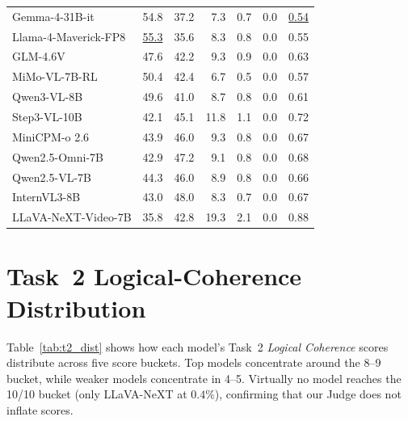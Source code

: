 \documentclass{article}
\newcommand{\second}[1]{\underline{#1}}
\begin{document}
\begin{table}[t]
{\begin{tabular}{lrrrrrr}
Gemma-4-31B-it       & 54.8 & 37.2 &  7.3 &  0.7 &  0.0 & \second{0.54} \\
Llama-4-Maverick-FP8 & \second{55.3} & 35.6 &  8.3 &  0.8 &  0.0 & 0.55 \\
GLM-4.6V             & 47.6 & 42.2 &  9.3 &  0.9 &  0.0 & 0.63 \\
MiMo-VL-7B-RL        & 50.4 & 42.4 &  6.7 &  0.5 &  0.0 & 0.57 \\
Qwen3-VL-8B          & 49.6 & 41.0 &  8.7 &  0.8 &  0.0 & 0.61 \\
Step3-VL-10B         & 42.1 & 45.1 & 11.8 &  1.1 &  0.0 & 0.72 \\
MiniCPM-o 2.6        & 43.9 & 46.0 &  9.3 &  0.8 &  0.0 & 0.67 \\
Qwen2.5-Omni-7B      & 42.9 & 47.2 &  9.1 &  0.8 &  0.0 & 0.68 \\
Qwen2.5-VL-7B        & 44.3 & 46.0 &  8.9 &  0.8 &  0.0 & 0.66 \\
InternVL3-8B         & 43.0 & 48.0 &  8.3 &  0.7 &  0.0 & 0.67 \\
LLaVA-NeXT-Video-7B  & 35.8 & 42.8 & 19.3 &  2.1 &  0.0 & 0.88 \\
\bottomrule
\end{tabular}%
}
\end{table}

\section{Task~2 Logical-Coherence Distribution}
\label{app:t2_dist}

Table~\ref{tab:t2_dist} shows how each model's Task~2 \emph{Logical Coherence} scores distribute across five score buckets. Top models concentrate around the 8--9 bucket, while weaker models concentrate in 4--5. Virtually no model reaches the 10/10 bucket (only LLaVA-NeXT at $0.4\%$), confirming that our Judge does not inflate scores.
\end{document}
